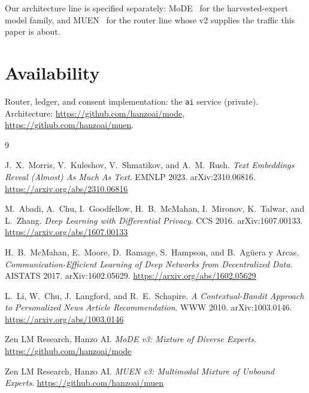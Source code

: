 \documentclass[11pt,a4paper]{article}
\begin{document}
Our architecture line is specified separately: MoDE~\cite{mode} for the harvested-expert
model family, and MUEN~\cite{muen} for the router line whose v2 supplies the traffic this
paper is about.

\section*{Availability}

Router, ledger, and consent implementation: the \texttt{ai} service (private). Architecture:
\url{https://github.com/hanzoai/mode}, \url{https://github.com/hanzoai/muen}.

\begin{thebibliography}{9}

J.~X.~Morris, V.~Kuleshov, V.~Shmatikov, and A.~M.~Rush.
\emph{Text Embeddings Reveal (Almost) As Much As Text}. EMNLP 2023. arXiv:2310.06816.
\url{https://arxiv.org/abs/2310.06816}

M.~Abadi, A.~Chu, I.~Goodfellow, H.~B.~McMahan, I.~Mironov, K.~Talwar, and L.~Zhang.
\emph{Deep Learning with Differential Privacy}. CCS 2016. arXiv:1607.00133.
\url{https://arxiv.org/abs/1607.00133}

H.~B.~McMahan, E.~Moore, D.~Ramage, S.~Hampson, and B.~Agüera y Arcas.
\emph{Communication-Efficient Learning of Deep Networks from Decentralized Data}.
AISTATS 2017. arXiv:1602.05629.
\url{https://arxiv.org/abs/1602.05629}

L.~Li, W.~Chu, J.~Langford, and R.~E.~Schapire.
\emph{A Contextual-Bandit Approach to Personalized News Article Recommendation}.
WWW 2010. arXiv:1003.0146.
\url{https://arxiv.org/abs/1003.0146}

Zen LM Research, Hanzo AI.
\emph{MoDE v3: Mixture of Diverse Experts}.
\url{https://github.com/hanzoai/mode}

Zen LM Research, Hanzo AI.
\emph{MUEN v3: Multimodal Mixture of Unbound Experts}.
\url{https://github.com/hanzoai/muen}

\end{thebibliography}
\end{document}
